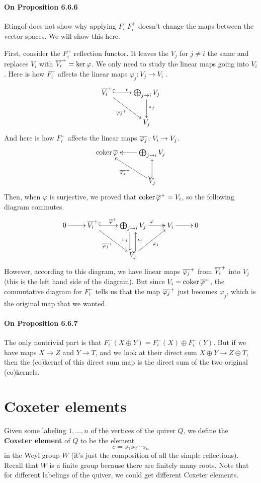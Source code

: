 \documentclass[oneside]{scrbook}
\begin{document}
\paragraph{On Proposition 6.6.6}
Etingof does not show why applying $F_i^{-}F_i^{+}$ doesn't change the maps between the vector spaces. We will show this here.

First, consider the $F_i^{+}$ reflection functor. It leaves the $V_j$ for $j\neq i$ the same and replaces $V_i$ with $\overline{V_i}^{+}=\ker \varphi$. We only need to study the linear maps going into $V_i$. Here is how $F_i^{+}$ affects the linear maps $\varphi_j\colon V_j\to V_i$ .
\[\xymatrix{
\ol{V_i}^{+} \ar@{^{(}->}[r]^{\iota} \ar[rd]_{\ol{\varphi_j}^{+}} & \bigoplus_{j\to i}V_j \ar[d]^{\pi_j}\\
 & V_j}\]
And here is how $F_i^{-}$ affects the linear maps $\overline{\varphi_j}\colon V_i\to V_j$. 
\[\xymatrix{
\coker \ol{\varphi} & \ar@{->>}[l]  \bigoplus_{j\to i}V_j\\
& V_j \ar[lu]^{\ol{\varphi_j}^{-}} \ar@{^{(}->}[u]}\]
Then, when $\varphi$ is surjective, we proved that $\operatorname{coker} \overline{\varphi}^{+}=V_i$, so the following diagram commutes. 
\[\xymatrix{0 \ar[r] & \ol{V_i}^{+} \ar@{^{(}->}[r]^{\ol{\varphi}^{+}} \ar[rd]_{\ol{\varphi_j}^{+}} & \bigoplus_{j\to i} V_j \ar@{->>}[r]^{\varphi} \ar@<-1ex>[d]_{\pi_j} & V_i \ar[r] & 0\\
& & V_j \ar@{^{(}->}@<-.9ex>[u]_{\iota_j} \ar[ru]_{\varphi_j} & }\]
However, according to this diagram, we have linear maps $\overline{\varphi_j}^{+}$ from $\overline{V_i}^{+}$ into $V_j$ (this is the left hand side of the diagram). But since $V_i=\operatorname{coker} \overline{\varphi}^{+}$, the commutative diagram for $F_i^{-}$ tells us that the map $\overline{\varphi_j}^{+}$ just becomes $\varphi_j$, which is the original map that we wanted.

\paragraph{On Proposition 6.6.7} The only nontrivial part is that $F_i^-(X\oplus Y)=F_i^-(X)\oplus F_i^-(Y)$. But if we have maps $X\to Z$ and $Y\to T$, and we look at their direct sum $X\oplus Y\to Z\oplus T$, then the (co)kernel of this direct sum map is the direct sum of the two original (co)kernels.


\section{Coxeter elements}
Given some labeling $1,\ldots,n$ of the vertices of the quiver $Q$, we define the \textbf{Coxeter element} of $Q$ to be the element
\[c=s_1s_2\cdots s_n\]
in the Weyl group $W$ (it's just the composition of all the simple reflections). Recall that $W$ is a finite group because there are finitely many roots. Note that for different labelings of the quiver, we could get different Coxeter elements. 
\end{document}
